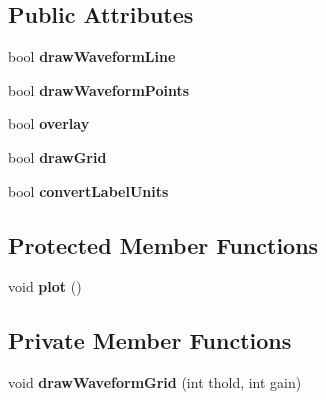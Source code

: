\subsection*{Public Attributes}
\begin{DoxyCompactItemize}
\item 
\hypertarget{classWaveAxes_a76257ba1d18136073d166d644e705531}{bool {\bfseries draw\-Waveform\-Line}}\label{classWaveAxes_a76257ba1d18136073d166d644e705531}

\item 
\hypertarget{classWaveAxes_a7a8fdc89f6d4f0dedc6711ad3500c358}{bool {\bfseries draw\-Waveform\-Points}}\label{classWaveAxes_a7a8fdc89f6d4f0dedc6711ad3500c358}

\item 
\hypertarget{classWaveAxes_a48c33abae62a2c2449c5ed19436f44ca}{bool {\bfseries overlay}}\label{classWaveAxes_a48c33abae62a2c2449c5ed19436f44ca}

\item 
\hypertarget{classWaveAxes_abec2c03401e4f4282238a164153ec17d}{bool {\bfseries draw\-Grid}}\label{classWaveAxes_abec2c03401e4f4282238a164153ec17d}

\item 
\hypertarget{classWaveAxes_ad3f862d07a773b1259cf7cc027aab21b}{bool {\bfseries convert\-Label\-Units}}\label{classWaveAxes_ad3f862d07a773b1259cf7cc027aab21b}

\end{DoxyCompactItemize}
\subsection*{Protected Member Functions}
\begin{DoxyCompactItemize}
\item 
\hypertarget{classWaveAxes_a9b247805f9b3962b1a31a935a73de6a6}{void {\bfseries plot} ()}\label{classWaveAxes_a9b247805f9b3962b1a31a935a73de6a6}

\end{DoxyCompactItemize}
\subsection*{Private Member Functions}
\begin{DoxyCompactItemize}
\item 
\hypertarget{classWaveAxes_ac2e6744baeb75b0133e09c795cbca415}{void {\bfseries draw\-Waveform\-Grid} (int thold, int gain)}\label{classWaveAxes_ac2e6744baeb75b0133e09c795cbca415}

\end{DoxyCompactItemize}
